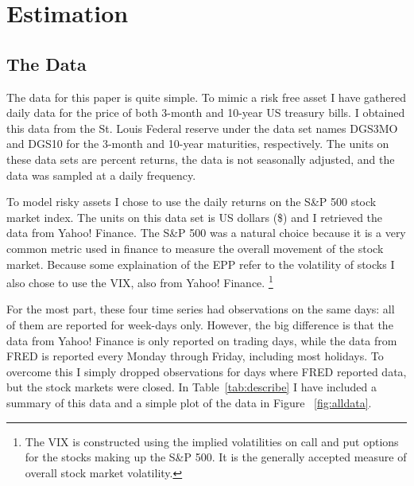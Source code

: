 \documentclass[a4paper, 11pt]{article}
\theoremstyle{definition} %
\numberwithin{equation}{section}
\begin{document}
\section{Estimation} \label{sec:estimation}

  \subsection{The Data} \label{sub:the_data}

    The data for this paper is quite simple. To mimic a risk free asset I have gathered daily data for the price of both 3-month and 10-year US treasury bills. I obtained this data from the St. Louis Federal reserve under the data set names DGS3MO and DGS10 for the 3-month and 10-year maturities, respectively. The units on these data sets are percent returns, the data is not seasonally adjusted, and the data was sampled at a daily frequency.

    To model risky assets I chose to use the daily returns on the S\&P 500 stock market index.  The units on this data set is US dollars (\$) and I retrieved the data from Yahoo! Finance. The S\&P 500 was a natural choice because it is a very common metric used in finance to measure the overall movement of the stock market. Because some explaination of the EPP refer to the volatility of stocks I also chose to use the VIX, also from Yahoo! Finance. \footnote{The VIX is constructed using the implied volatilities on call and put options for the stocks making up the S\&P 500. It is the generally accepted measure of overall stock market volatility.}

    For the most part, these four time series had observations on the same days: all of them are reported for week-days only. However, the big difference is that the data from Yahoo! Finance is only reported on trading days, while the data from FRED is reported every Monday through Friday, including most holidays. To overcome this I simply dropped observations for days where FRED reported data, but the stock markets were closed. In Table~\ref{tab:describe} I have included a summary of this data and a simple plot of the data in Figure ~\ref{fig:alldata}.
\end{document}
